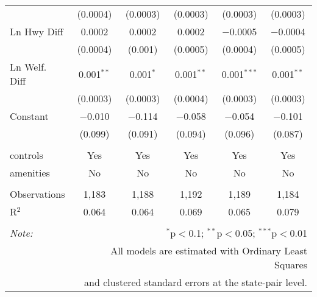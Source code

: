 \begin{table}[!htbp]
\begin{tabular}{@{\extracolsep{5pt}}lccccc}
  & (0.0004) & (0.0003) & (0.0003) & (0.0003) & (0.0003) \\ 
  Ln Hwy Diff & 0.0002 & 0.0002 & 0.0002 & $-$0.0005 & $-$0.0004 \\ 
  & (0.0004) & (0.001) & (0.0005) & (0.0004) & (0.0005) \\ 
  Ln Welf. Diff & 0.001$^{**}$ & 0.001$^{*}$ & 0.001$^{**}$ & 0.001$^{***}$ & 0.001$^{**}$ \\ 
  & (0.0003) & (0.0003) & (0.0004) & (0.0003) & (0.0003) \\ 
  Constant & $-$0.010 & $-$0.114 & $-$0.058 & $-$0.054 & $-$0.101 \\ 
  & (0.099) & (0.091) & (0.094) & (0.096) & (0.087) \\ 
 \hline \\[-1.8ex] 
controls & Yes & Yes & Yes & Yes & Yes \\ 
amenities & No & No & No & No & No \\ 
\hline \\[-1.8ex] 
Observations & 1,183 & 1,188 & 1,192 & 1,189 & 1,184 \\ 
R$^{2}$ & 0.064 & 0.064 & 0.069 & 0.065 & 0.079 \\ 
\hline 
\hline \\[-1.8ex] 
\textit{Note:}  & \multicolumn{5}{r}{$^{*}$p$<$0.1; $^{**}$p$<$0.05; $^{***}$p$<$0.01} \\ 
 & \multicolumn{5}{r}{All models are estimated with Ordinary Least Squares} \\ 
 & \multicolumn{5}{r}{and clustered standard errors at the state-pair level.} \\ 
\end{tabular} 
\end{table} 
